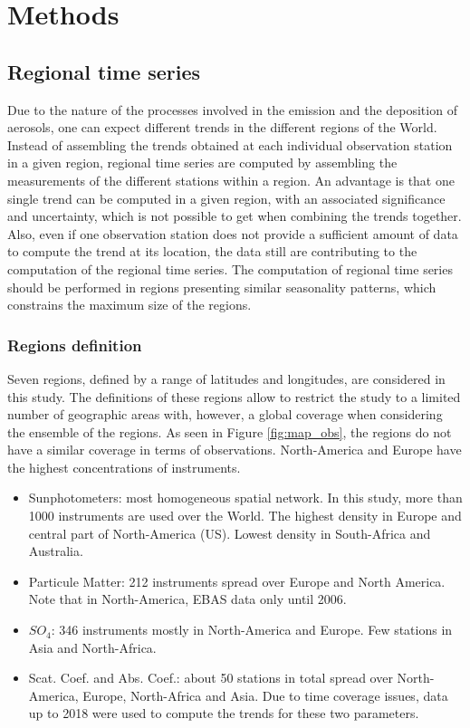 \documentclass[journal abbreviation, manuscript]{copernicus}
\begin{document}
\section{Methods}

\subsection{Regional time series}
Due to the nature of the processes involved in the emission and the deposition of aerosols, one can expect different trends in the different regions of the World.
Instead of assembling the trends obtained at each individual observation station in a given region, regional time series are computed by assembling the measurements of the different stations within a region. An advantage is that one single trend can be computed in a given region, with an associated significance and uncertainty, which is not possible to get when combining the trends together. Also, even if one observation station does not provide a sufficient amount of data to compute the trend at its location, the data still are contributing to the computation of the regional time series.
The computation of regional time series should be performed in regions presenting similar seasonality patterns, which constrains the maximum size of the regions.


\subsubsection{Regions definition}
Seven regions, defined by a range of latitudes and longitudes, are considered in this study. The definitions of these regions allow to restrict the study to a limited number of geographic areas with, however, a global coverage when considering the ensemble of the regions. As seen in Figure \ref{fig:map_obs}, the regions do not have a similar coverage in terms of observations. North-America and Europe have the highest concentrations of instruments.
\begin{itemize}
 \item Sunphotometers: most homogeneous spatial network. In this study, more than 1000 instruments are used over the World. The highest density in Europe and central part of North-America (US). Lowest density in South-Africa and Australia.
 \item Particule Matter: 212 instruments spread over Europe and North America. Note that in North-America, EBAS data only until 2006.
 \item $SO_{4}$: 346 instruments mostly in North-America and Europe. Few stations in Asia and North-Africa.
 \item Scat. Coef. and Abs. Coef.: about 50 stations in total spread over North-America, Europe, North-Africa and Asia. Due to time coverage issues, data up to 2018 were used to compute the trends for these two parameters.
\end{itemize}
\end{document}
